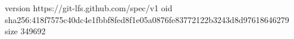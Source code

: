 version https://git-lfs.github.com/spec/v1
oid sha256:418f7575c40dc4e1fbbf8fed8f1e05a0876fe83772122b3243d8d97618646279
size 349692
